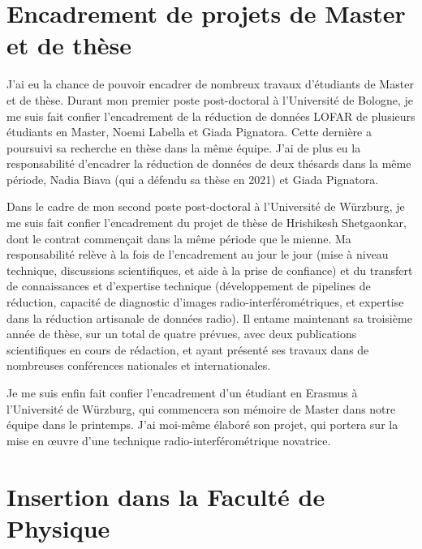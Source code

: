 \section{Encadrement de projets de Master et de th\`ese}

\pg
J'ai eu la chance de pouvoir encadrer de nombreux travaux d'\'etudiants de Master et de th\`ese. Durant mon premier poste post-doctoral \`a l'Universit\'e de Bologne, je me suis fait confier l'encadrement de la r\'eduction de donn\'ees LOFAR de plusieurs \'etudiants en Master, Noemi Labella et Giada Pignatora. Cette derni\`ere a poursuivi sa recherche en th\`ese dans la m\^eme \'equipe. J'ai de plus eu la responsabilit\'e d'encadrer la r\'eduction de donn\'ees de deux th\'esards dans la m\^eme p\'eriode, Nadia Biava (qui a d\'efendu sa th\`ese en 2021) et Giada Pignatora.

\pg
Dans le cadre de mon second poste post-doctoral \`a l'Universit\'e de W\"urzburg, je me suis fait confier l'encadrement du projet de th\`ese de Hrishikesh Shetgaonkar, dont le contrat commen\c{c}ait dans la m\^eme p\'eriode que le mienne. Ma responsabilit\'e rel\`eve \`a la fois de l'encadrement au jour le jour (mise \`a niveau technique, discussions scientifiques, et aide \`a la prise de confiance) et du transfert de connaissances et d'expertise technique (d\'eveloppement de pipelines de r\'eduction, capacit\'e de diagnostic d'images radio-interf\'erom\'etriques, et expertise dans la r\'eduction artisanale de donn\'ees radio). Il entame maintenant sa troisi\`eme ann\'ee de th\`ese, sur un total de quatre pr\'evues, avec deux publications scientifiques en cours de r\'edaction, et ayant pr\'esent\'e ses travaux dans de nombreuses conf\'erences nationales et internationales. 

\pg
Je me suis enfin fait confier l'encadrement d'un \'etudiant en Erasmus \`a l'Universit\'e de W\"urzburg, qui commencera son m\'emoire de Master dans notre \'equipe dans le printemps. J'ai moi-m\^eme \'elabor\'e son projet, qui portera sur la mise en {\oe}uvre d'une technique radio-interf\'erom\'etrique novatrice. 

\section{Insertion dans la Facult\'e de Physique}


